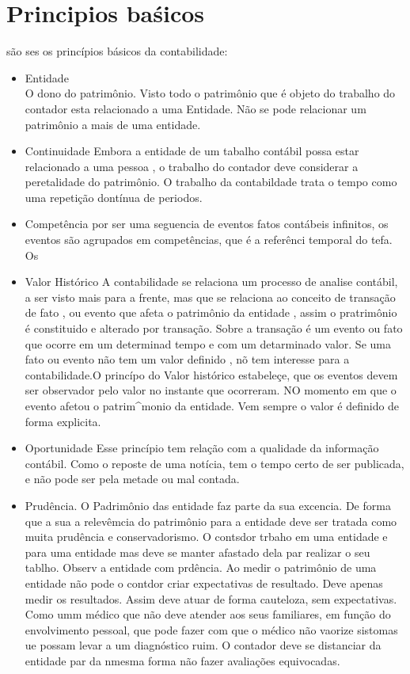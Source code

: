 \section{Principios baśicos}
são ses os princípios básicos da contabilidade:
\begin{itemize}
\item Entidade\\
  O dono do patrimônio. Visto todo o patrimônio que é objeto do trabalho do contador esta relacionado a uma Entidade. Não se pode relacionar um patrimônio a mais de uma entidade. 
\item Continuidade
  Embora a entidade de um tabalho contábil possa estar relacionado a uma pessoa , o trabalho do contador deve considerar a peretalidade do patrimônio. O trabalho da contabildade trata o tempo como uma repetição dontínua de periodos. 
\item Competência
  por ser uma seguencia de eventos fatos contábeis infinitos, os eventos são agrupados em competências, que é a referênci temporal do tefa.
  Os 
\item Valor Histórico
  A contabilidade se relaciona um processo de analise contábil, a ser visto mais para a frente, mas que se relaciona ao conceito de transação de fato , ou evento que afeta o patrimônio da entidade , assim o pratrimônio é constituido e alterado por transação. Sobre a transação é um evento ou fato que ocorre em um determinad tempo e com um detarminado valor. Se uma fato ou evento não tem um valor definido , nõ tem interesse para a contabilidade.O princípo do Valor histórico estabeleçe, que os eventos devem ser observador pelo valor no instante que ocorreram. NO momento em que o evento afetou o patrim^monio da entidade. Vem sempre o valor é definido de forma explicita.\\
\item Oportunidade
  Esse princípio tem relação com a qualidade da informação contábil. Como o reposte de uma notícia, tem o tempo certo de ser publicada, e não pode ser pela metade ou mal contada.\\
\item Prudência.
  O Padrimônio das entidade faz parte da sua excencia. De forma que a sua a relevêmcia do patrimônio para a entidade deve ser tratada como muita prudência e conservadorismo. O contsdor trbaho em uma entidade e para uma entidade mas deve se manter afastado dela par realizar o seu tablho. Observ a entidade com prdência. Ao medir o patrimônio de uma entidade não pode o contdor criar expectativas de resultado. Deve apenas medir os resultados. Assim deve atuar de forma cauteloza, sem expectativas. Como umm médico que não deve atender aos seus familiares, em função do envolvimento pessoal, que pode fazer com que o médico não vaorize sistomas ue possam levar a um diagnóstico ruim. O contador deve se distanciar da entidade par da nmesma forma não fazer avaliações equivocadas.
\end{itemize}

